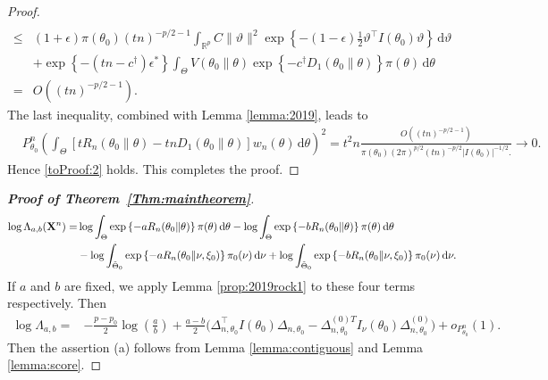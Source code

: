 \documentclass[11pt]{article}
\theoremstyle{plain}
\theoremstyle{definition}
\theoremstyle{remark}
\begin{document}
\begin{appendices}
\begin{proof}
\begin{align*}
     \\
     \leq&
    (1+\epsilon) \pi(\theta_0)
    (tn)^{-p/2 - 1}
     \int_{ \mathbb R^p}
     C\|\vartheta \|^2
     \exp\left\{ - (1-\epsilon) \frac{1}{2}  \vartheta^\top I(\theta_0) \vartheta \right\} 
     \, \mathrm d \vartheta
     \\
     &+
     \exp\left\{ -(tn- c^\dagger) \epsilon^* \right\} \int_{\Theta} V(\theta_0 \| \theta) \exp\left\{ - c^\dagger D_1(\theta_0 \| \theta) \right\} \pi(\theta) \, \mathrm d \theta
     \\
     =&
     O\left( (tn)^{ - p/2 - 1 }\right)
     .
\end{align*}
The last inequality, combined with Lemma \ref{lemma:2019}, leads to
\begin{align*}
    &
    P_{\theta_0}^n
    \left( 
    \int_{\Theta}
    \left[   t R_n(\theta_0\| \theta) - tn D_1 (\theta_0 \| \theta )  \right]
    w_n (\theta) \, \mathrm d \theta
    \right)^2
    =
    t^2 n
    \frac{
        O\left( 
         (tn)^{-p/2-1}
    \right)
}
{
    \pi(\theta_0)
    \left( 
        {2\pi}
    \right)^{p/2}
    \left( 
    { tn}
\right)^{-p/2}
    | I (\theta_0) |^{-1/2}. 
}
\to 0
    .
\end{align*}
Hence \eqref{toProof:2} holds.
This completes the proof.

\end{proof}





    \begin{proof}[\textbf{Proof of Theorem~\ref{Thm:maintheorem}}]
$$
\begin{aligned}
    \log \Lambda_{a,b} (\mathbf{X}^n)
    =&
    \log\int_{\Theta}
    \exp\left\{-a R_n(\theta_0\| \theta) \right\} \pi(\theta)
\, \mathrm d \theta
-
    \log\int_{\Theta}
    \exp\left\{-b R_n(\theta_0\| \theta) \right\} \pi(\theta)
\, \mathrm d \theta
    \\
    &
    -\log\int_{\tilde \Theta_0}
    \exp\left\{-a R_n(\theta_0\| \nu, \xi_0) \right\} \pi_0(\nu)
\, \mathrm d \nu
+\log\int_{\tilde \Theta_0}
    \exp\left\{-b R_n(\theta_0\| \nu, \xi_0) \right\} \pi_0(\nu)
\, \mathrm d \nu
.
\end{aligned}
$$
If $a$ and $b$ are fixed, we apply Lemma \ref{prop:2019rock1} to these four terms respectively.
Then
        \begin{align*}
\log \Lambda_{a,b}
    =&
    -\frac{p-p_0}{2}\log \left(\frac{a}{b}\right)
    +
    \frac{a-b}{2}\Big(
        \Delta_{n,\theta_0}^\top  I(\theta_0) \Delta_{n,\theta_0}
    -
    \Delta_{n,\theta_0}^{{(0)}T} I_{\nu}(\theta_0) \Delta^{(0)}_{n,\theta_0}
    \Big)
    +o_{P^n_{\theta_0}}(1).
        \end{align*}
        Then the assertion (a) follows from Lemma \ref{lemma:contiguous} and Lemma \ref{lemma:score}.


\end{proof}
\end{appendices}
\end{document}
